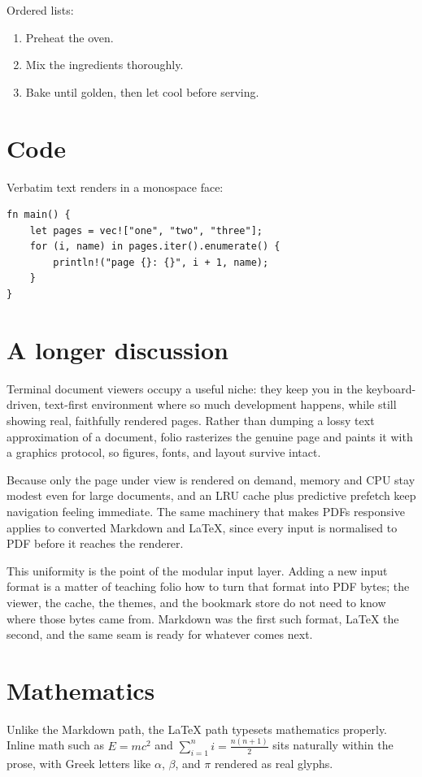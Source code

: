\documentclass[11pt]{article}
\begin{document}
Ordered lists:
\begin{enumerate}
    \item Preheat the oven.
    \item Mix the ingredients thoroughly.
    \item Bake until golden, then let cool before serving.
\end{enumerate}

\section{Code}
Verbatim text renders in a monospace face:
\begin{verbatim}
fn main() {
    let pages = vec!["one", "two", "three"];
    for (i, name) in pages.iter().enumerate() {
        println!("page {}: {}", i + 1, name);
    }
}
\end{verbatim}

\section{A longer discussion}
Terminal document viewers occupy a useful niche: they keep you in the
keyboard-driven, text-first environment where so much development happens, while
still showing real, faithfully rendered pages. Rather than dumping a lossy text
approximation of a document, folio rasterizes the genuine page and paints it with
a graphics protocol, so figures, fonts, and layout survive intact.

Because only the page under view is rendered on demand, memory and CPU stay
modest even for large documents, and an LRU cache plus predictive prefetch keep
navigation feeling immediate. The same machinery that makes PDFs responsive
applies to converted Markdown and LaTeX, since every input is normalised to PDF
before it reaches the renderer.

This uniformity is the point of the modular input layer. Adding a new input
format is a matter of teaching folio how to turn that format into PDF bytes; the
viewer, the cache, the themes, and the bookmark store do not need to know where
those bytes came from. Markdown was the first such format, LaTeX the second, and
the same seam is ready for whatever comes next.

\section{Mathematics}
Unlike the Markdown path, the LaTeX path typesets mathematics properly. Inline
math such as $E = mc^2$ and $\sum_{i=1}^{n} i = \frac{n(n+1)}{2}$ sits naturally
within the prose, with Greek letters like $\alpha$, $\beta$, and $\pi$ rendered as
real glyphs.
\end{document}
